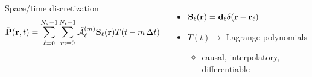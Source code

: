 \documentclass[aspectratio=169]{beamer}
\begin{document}
\begin{frame}
  \begin{columns}[T]
      \centering
      

      \begin{block}{Space/time discretization}
        \begin{equation*}
          \tilde{\vb{P}}(\vb{r}, t) = \sum_{\ell = 0}^{N_s - 1} \sum_{m = 0}^{N_t - 1} \tilde{\mathcal{A}}_\ell^{(m)}\vb{S}_\ell(\vb{r}) T(t - m \, \Delta t)
        \end{equation*}
      \end{block}
      \begin{itemize}
        \item $\vb{S}_\ell(\vb{r}) = \vb{d}_\ell \delta(\vb{r} - \vb{r}_\ell)$
        \item $T(t) \rightarrow$ Lagrange polynomials
          \begin{itemize}
            \item causal, interpolatory, differentiable
          \end{itemize}
      \end{itemize}
  \end{columns}
\end{frame}
\end{document}

